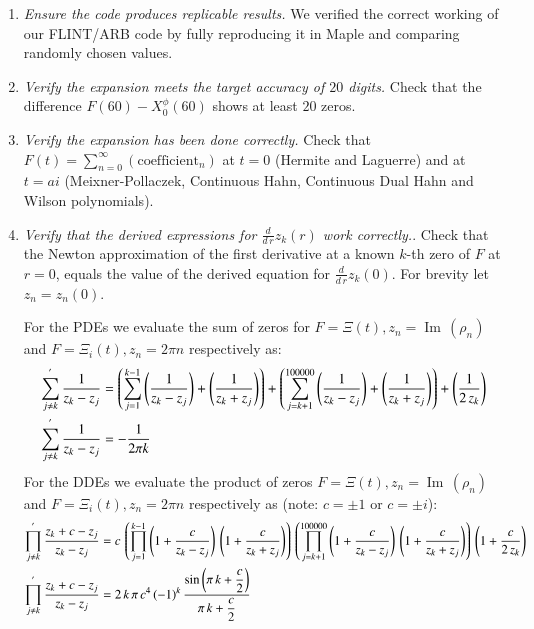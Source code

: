 \documentclass[a4paper,11pt,twoside]{amsart}
\renewcommand\Im{{\operatorname{Im\,}}}
\newcommand{\verifiedeq}{=}
\newcommand{\verifiedeq}{\stackrel{\checkmark}{=}}
\begin{document}
\begin{enumerate}
\item \textit{Ensure the code produces replicable results.} We verified the correct working of our FLINT/ARB code by fully reproducing it in Maple\texttrademark  \cite{map} and comparing randomly chosen values. 
\item  \textit{Verify the expansion meets the target accuracy of $20$ digits.} Check that the difference $F(60)-X^\phi_0(60)$ shows at least $20$ zeros.
\item  \textit{Verify the expansion has been done correctly.} Check that $F(t) \verifiedeq \sum_{n=0}^\infty (\text{coefficient}_n)$ at $t=0$ (Hermite and Laguerre) and at $t\verifiedeq ai$ (Meixner-Pollaczek, Continuous Hahn, Continuous Dual Hahn and Wilson polynomials). 
\item \textit{Verify that the derived expressions for $\frac{d}{d\,r}z_k(r)$ work correctly.}. Check that the Newton approximation of the first derivative at a known $k$-th zero of $F$ at $r=0$, equals the value of the derived equation for $\frac{d}{d\,r}z_k(0)$. For brevity let $z_n = z_n(0)$. 

For the PDEs we evaluate the sum of zeros for $F=\Xi(t), z_n=\Im(\rho_n)$ and $F=\Xi_i(t), z_n=2\pi n$ respectively as:
\begin{align}
 \sum_{j \ne k}^{'} \frac{1}{z_k-z_j} &\verifiedeq \left(\sum_{j =1}^{k-1} \left(\frac{1}{z_k-z_j}\right)+\left(\frac{1}{z_k+z_j}\right)\right) +\left(\sum_{j = k+1}^{100000} \left(\frac{1}{z_k-z_j}\right)+\left(\frac{1}{z_k+z_j}\right)\right)+\left(\frac{1}{2\,z_k} \right) \notag \\
  \sum_{j \ne k}^{'} \frac{1}{z_k-z_j} &\verifiedeq -\frac{1}{2\pi k} \notag
\end{align}
For the DDEs we evaluate the product of zeros $F\verifiedeq \Xi(t), z_n=\Im(\rho_n)$ and $F=\Xi_i(t), z_n=2\pi n$ respectively as (note: $c \verifiedeq \pm 1$ or $c =\pm i$):
\begin{align}
 \prod_{j \ne k}^{'} \frac{z_k+c-z_j}{z_k-z_j} &\verifiedeq c\,\left(\prod_{j =1}^{k-1} \left(1+\frac{c}{z_k-z_j}\right)\,\left(1+\frac{c}{z_k+z_j}\right)\right)\,\left(\prod_{j = k+1}^{100000} \left(1+\frac{c}{z_k-z_j}\right)\,\left(1+\frac{c}{z_k+z_j}\right)\right)\,\left(1+\frac{c}{2\,z_k} \right) \notag \\
 \prod_{j \ne k}^{'} \frac{z_k+c-z_j}{z_k-z_j} &\verifiedeq 2\,k\,\pi\,c^4\,(-1)^k\,\frac{\sin\left(\pi\,k+\dfrac{c}{2}\right)}{\pi\,k+\dfrac{c}{2}} \notag
\end{align}
\end{enumerate}
\end{document}
